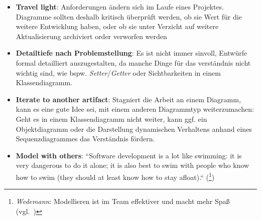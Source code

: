 \begin{itemize}
    \item \textbf{Travel light}: Anforderungen ändern sich im Laufe eines Projektes.
    Diagramme sollten deshalb kritisch überprüft werden, ob sie Wert für die weitere Entwicklung haben, oder ob sie unter Verzicht auf weitere Aktualisierung archiviert order verworfen werden
    \item \textbf{Detailtiefe nach Problemstellung}: Es ist nicht immer sinvoll, Entwürfe formal detailliert auszugestalten, da manche Dinge für das verständnis nicht wichtig sind, wie bspw. \textit{Setter}/\textit{Getter} oder Sichtbarkeiten in einem Klassendiagramm.
    \item \textbf{Iterate to another artifact}: Stagniert die Arbeit an einem Diagramm, kann es eine gute Idee sei, mit einem anderen Diagrammtyp weiterzumachen: Geht es in einem Klassendiagramm nicht weiter, kann ggf. ein Objektdiagramm oder die Darstellung dynamischen Verhaltens anhand eines Sequenzdiagrammes das Verständnis fördern.
    \item \textbf{Model with others}: ``Software development is a lot like swimming: it is very dangerous to do it alone; it is also best to swim with people who know how to swim (they should at least know how to stay afloat).`` (\cite[52]{Amb04}\footnote{
    \textit{Wedemann}: Modellieren ist im Team effektiver und macht mehr Spaß (vgl.~\cite[52]{Wed09b})
    })
\end{itemize}
